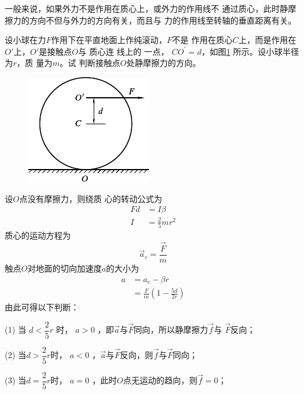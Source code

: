 一般来说，如果外力不是作用在质心上，或外力的作用线不
通过质心，此时静摩擦力的方向不但与外力的方向有关，而且与
力的作用线至转轴的垂直距离有关。

\example 设小球在力$ F $作用下在平直地面上作纯滚动，$ F $不是
作用在质心$ C $上，而是作用在$ O' $上，$ O' $是接触点$ O $与
质心连
\clearpage\noindent
线上的
一点， $ C O ^ { \prime } = d $，如图\ref{fig:10.18} 所示。设小球半径为$ r $，质
量为$ m $。试
判断接触点$ O $处静摩擦力的方向。

\begin{figure}
  \centering
  \includegraphics{figure/fig10.18}
  \caption{}
  \label{fig:10.18}
\end{figure}
\solution 设$ O $点没有摩擦力，则绕质
心的转动公式为
\begin{equation*}
  \begin{split}
    F d &= I \beta \\
    I &= \frac { 2 } { 5 } m r ^ { 2 }
  \end{split}
\end{equation*}
质心的运动方程为
\begin{equation*}
  \vec{a} _ { c } = \frac { \vec{F} } { m }
\end{equation*}
触点$ O $对地面的切向加速度$ a $的大小为
\begin{equation*}
  \begin{split}
    a &= a _ { c } - \beta r \\
    &= \frac { F } { m } \left( 1 - \frac { 5 d } { 2 r } \right)
  \end{split}
\end{equation*}
由此可得以下判断：

(1) 当 $ d < \dfrac { 2 } { 5 } r $ 时， $ a > 0 $ ，即$ \vec{a} $与$ \vec{F} $同向，所以静摩擦力$ \vec{f} $与
$ \vec{F} $反向；

(2) 当$ d > \dfrac { 2 } { 5 } r $时， $ a < 0 $ ，$ \vec{a} $与$ \vec{F} $反向，则$ \vec{f} $与$ \vec{F} $同向；

(3) 当$ d = \dfrac { 2 } { 5 } r $时， $ a = 0 $ ，此时$ O $点无运动的趋向，则$ \vec{f} = 0 $；

